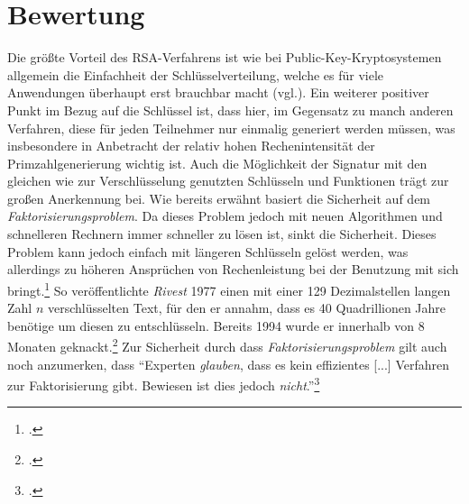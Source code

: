\documentclass{scrarticle}
\begin{document}
    \section{Bewertung} \label{sec:bewertung}
        Die größte Vorteil des RSA-Verfahrens ist wie bei Public-Key-Kryptosystemen allgemein die Einfachheit der Schlüsselverteilung, welche es für viele Anwendungen überhaupt erst brauchbar macht (vgl.\cite[285]{dankmeier2006}). Ein weiterer positiver Punkt im Bezug auf die Schlüssel ist, dass hier, im Gegensatz zu manch anderen Verfahren, diese für jeden Teilnehmer nur einmalig generiert werden müssen, was insbesondere in Anbetracht der relativ hohen Rechenintensität der Primzahlgenerierung wichtig ist. Auch die Möglichkeit der Signatur mit den gleichen wie zur Verschlüsselung genutzten Schlüsseln und Funktionen trägt zur großen Anerkennung bei. Wie bereits erwähnt basiert die Sicherheit auf dem \emph{Faktorisierungsproblem}. Da dieses Problem jedoch mit neuen Algorithmen und schnelleren Rechnern immer schneller zu lösen ist, sinkt die Sicherheit. Dieses Problem kann jedoch einfach mit längeren Schlüsseln gelöst werden, was allerdings zu höheren Ansprüchen von Rechenleistung bei der Benutzung mit sich bringt.\footcite[vgl.][]{zum2020} So veröffentlichte \emph{Rivest} 1977 einen mit einer 129 Dezimalstellen langen Zahl $n$ verschlüsselten Text, für den er annahm, dass es 40 Quadrillionen Jahre benötige um diesen zu entschlüsseln. Bereits 1994 wurde er innerhalb von 8 Monaten geknackt.\footcite[vgl.][73]{watjen2008} Zur Sicherheit durch dass \emph{Faktorisierungsproblem} gilt auch noch anzumerken, dass \enquote{Experten \emph{glauben}, dass es kein effizientes [...] Verfahren zur Faktorisierung gibt. Bewiesen ist dies jedoch \emph{nicht}.}\footcite[80]{ertel2003}
\end{document}
